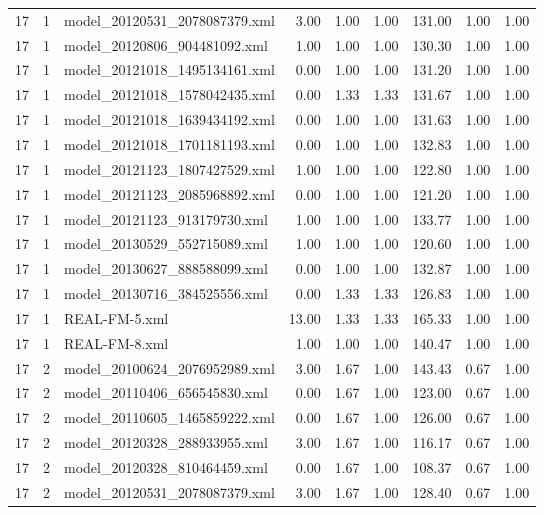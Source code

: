 \begin{table}[ht]
\begin{tabular}{rrlrrrrrr}
   17 &   1 & model\_20120531\_2078087379.xml & 3.00 & 1.00 & 1.00 & 131.00 & 1.00 & 1.00 \\ 
   17 &   1 & model\_20120806\_904481092.xml & 1.00 & 1.00 & 1.00 & 130.30 & 1.00 & 1.00 \\ 
   17 &   1 & model\_20121018\_1495134161.xml & 0.00 & 1.00 & 1.00 & 131.20 & 1.00 & 1.00 \\ 
   17 &   1 & model\_20121018\_1578042435.xml & 0.00 & 1.33 & 1.33 & 131.67 & 1.00 & 1.00 \\ 
   17 &   1 & model\_20121018\_1639434192.xml & 0.00 & 1.00 & 1.00 & 131.63 & 1.00 & 1.00 \\ 
   17 &   1 & model\_20121018\_1701181193.xml & 0.00 & 1.00 & 1.00 & 132.83 & 1.00 & 1.00 \\ 
   17 &   1 & model\_20121123\_1807427529.xml & 1.00 & 1.00 & 1.00 & 122.80 & 1.00 & 1.00 \\ 
   17 &   1 & model\_20121123\_2085968892.xml & 0.00 & 1.00 & 1.00 & 121.20 & 1.00 & 1.00 \\ 
   17 &   1 & model\_20121123\_913179730.xml & 1.00 & 1.00 & 1.00 & 133.77 & 1.00 & 1.00 \\ 
   17 &   1 & model\_20130529\_552715089.xml & 1.00 & 1.00 & 1.00 & 120.60 & 1.00 & 1.00 \\ 
   17 &   1 & model\_20130627\_888588099.xml & 0.00 & 1.00 & 1.00 & 132.87 & 1.00 & 1.00 \\ 
   17 &   1 & model\_20130716\_384525556.xml & 0.00 & 1.33 & 1.33 & 126.83 & 1.00 & 1.00 \\ 
   17 &   1 & REAL-FM-5.xml & 13.00 & 1.33 & 1.33 & 165.33 & 1.00 & 1.00 \\ 
   17 &   1 & REAL-FM-8.xml & 1.00 & 1.00 & 1.00 & 140.47 & 1.00 & 1.00 \\ 
   17 &   2 & model\_20100624\_2076952989.xml & 3.00 & 1.67 & 1.00 & 143.43 & 0.67 & 1.00 \\ 
   17 &   2 & model\_20110406\_656545830.xml & 0.00 & 1.67 & 1.00 & 123.00 & 0.67 & 1.00 \\ 
   17 &   2 & model\_20110605\_1465859222.xml & 0.00 & 1.67 & 1.00 & 126.00 & 0.67 & 1.00 \\ 
   17 &   2 & model\_20120328\_288933955.xml & 3.00 & 1.67 & 1.00 & 116.17 & 0.67 & 1.00 \\ 
   17 &   2 & model\_20120328\_810464459.xml & 0.00 & 1.67 & 1.00 & 108.37 & 0.67 & 1.00 \\ 
   17 &   2 & model\_20120531\_2078087379.xml & 3.00 & 1.67 & 1.00 & 128.40 & 0.67 & 1.00 \\ 

\end{tabular}
\end{table}
